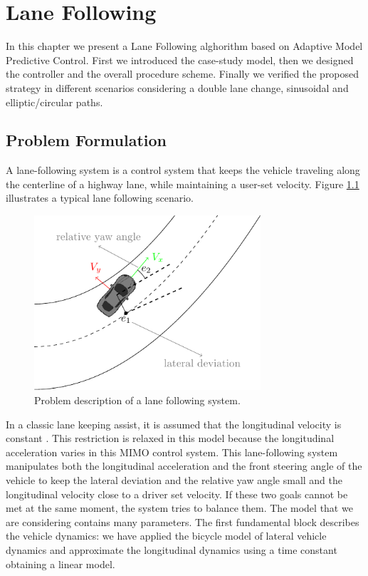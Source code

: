 \chapter{Lane Following}
In this chapter we present a Lane Following alghorithm based on Adaptive Model Predictive Control. First we introduced the case-study model, then we designed the controller and the overall procedure scheme. Finally we verified the proposed strategy in different scenarios considering a double lane change, sinusoidal and elliptic/circular paths.
\section{Problem Formulation}
A lane-following system is a control system that keeps the vehicle traveling along the centerline of a highway lane, while maintaining a user-set velocity. Figure \ref{fig:laneFollowing} illustrates a typical lane following scenario.
\begin{figure}[!h]
	\centering
	\includegraphics[width=0.75\textwidth]{./figure/laneFollowing/laneFollowing.pdf}
	\caption{Problem description of a lane following system.}
	\label{fig:laneFollowing}
\end{figure}

In a classic lane keeping assist, it is assumed that the longitudinal velocity is constant \cite{Adaptive_Mpc_Lane_keeping_borelli}. This restriction is relaxed in this model because the longitudinal acceleration varies in this MIMO control system. This lane-following system manipulates both the longitudinal acceleration and the front steering angle of the vehicle to keep the lateral deviation and the relative yaw angle small and the longitudinal velocity close to a driver set velocity. If these two goals cannot be met at the same moment, the system tries to balance them. The model that we are considering contains many parameters. The first fundamental block describes the vehicle dynamics: we have applied the bicycle model of lateral vehicle dynamics and approximate the longitudinal dynamics using a time constant obtaining  a linear model.

